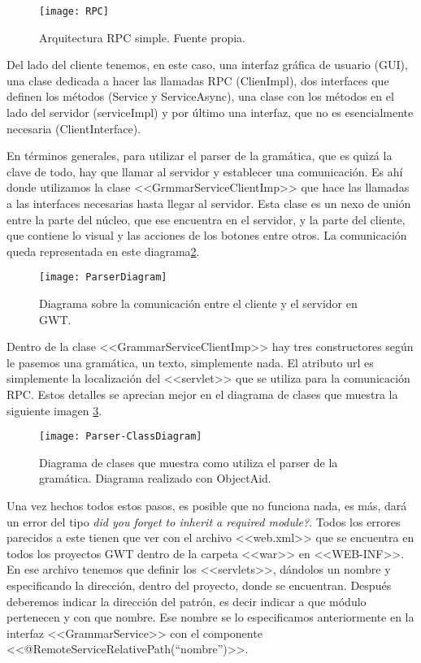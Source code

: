 \begin{figure}[h]
\centering
\texttt{[image: RPC]}
\caption{Arquitectura RPC simple. Fuente propia.}
\label{fig:5.1}
\end{figure}

Del lado del cliente tenemos, en este caso, una interfaz gráfica de usuario (GUI), una clase dedicada a hacer las llamadas RPC (ClienImpl), dos interfaces que definen los métodos (Service y ServiceAsync), una clase con los métodos en el lado del servidor (serviceImpl) y por último una interfaz, que no es esencialmente necesaria (ClientInterface). 

En términos generales, para utilizar el parser de la gramática, que es quizá la clave de todo, hay que llamar al servidor y establecer una comunicación. Es ahí donde utilizamos la clase <<GrmmarServiceClientImp>> que hace las llamadas a las interfaces necesarias hasta llegar al servidor. Esta clase es un nexo de unión entre la parte del núcleo, que ese encuentra en el servidor, y la parte del cliente, que contiene lo visual y las acciones de los botones entre otros. La comunicación queda representada en este diagrama\ref{fig:5.2}.

\begin{figure}[h]
\centering
\texttt{[image: ParserDiagram]}
\caption{Diagrama sobre la comunicación entre el cliente y el servidor en GWT.}
\label{fig:5.2}
\end{figure}

Dentro de la clase <<GrammarServiceClientImp>> hay tres constructores según le pasemos una gramática, un texto, simplemente nada. El atributo url es simplemente la localización del <<servlet>> que se utiliza para la comunicación RPC. Estos detalles se aprecian mejor en el diagrama de clases que muestra la siguiente imagen \ref{fig:5.3}.

\begin{figure}
\raggedleft
\texttt{[image: Parser-ClassDiagram]}
\caption{Diagrama de clases que muestra como utiliza el parser de la gramática. Diagrama realizado con ObjectAid.}
\label{fig:5.3}
\end{figure}

Una vez hechos todos estos pasos, es posible que no funciona nada, es más, dará un error del tipo \textit{did you forget to inherit a required module?}. Todos los errores parecidos a este tienen que ver con el archivo <<web.xml>> que se encuentra en todos los proyectos GWT dentro de la carpeta <<war>> en <<WEB-INF>>. En ese archivo tenemos que definir los <<servlets>>, dándolos un nombre y especificando la dirección, dentro del proyecto, donde se encuentran. Después deberemos indicar la dirección del patrón, es decir indicar a que módulo pertenecen y con que nombre. Ese nombre se lo especificamos anteriormente en la interfaz <<GrammarService>> con el componente <<@RemoteServiceRelativePath(``nombre'')>>.

